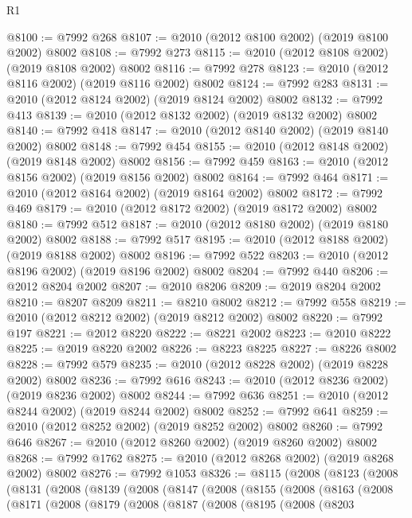 \begin{lexlean}{R1}
\begin{coremodule}
@8100 := @7992 @268
@8107 := @2010 (@2012 @8100 @2002) (@2019 @8100 @2002) @8002
@8108 := @7992 @273
@8115 := @2010 (@2012 @8108 @2002) (@2019 @8108 @2002) @8002
@8116 := @7992 @278
@8123 := @2010 (@2012 @8116 @2002) (@2019 @8116 @2002) @8002
@8124 := @7992 @283
@8131 := @2010 (@2012 @8124 @2002) (@2019 @8124 @2002) @8002
@8132 := @7992 @413
@8139 := @2010 (@2012 @8132 @2002) (@2019 @8132 @2002) @8002
@8140 := @7992 @418
@8147 := @2010 (@2012 @8140 @2002) (@2019 @8140 @2002) @8002
@8148 := @7992 @454
@8155 := @2010 (@2012 @8148 @2002) (@2019 @8148 @2002) @8002
@8156 := @7992 @459
@8163 := @2010 (@2012 @8156 @2002) (@2019 @8156 @2002) @8002
@8164 := @7992 @464
@8171 := @2010 (@2012 @8164 @2002) (@2019 @8164 @2002) @8002
@8172 := @7992 @469
@8179 := @2010 (@2012 @8172 @2002) (@2019 @8172 @2002) @8002
@8180 := @7992 @512
@8187 := @2010 (@2012 @8180 @2002) (@2019 @8180 @2002) @8002
@8188 := @7992 @517
@8195 := @2010 (@2012 @8188 @2002) (@2019 @8188 @2002) @8002
@8196 := @7992 @522
@8203 := @2010 (@2012 @8196 @2002) (@2019 @8196 @2002) @8002
@8204 := @7992 @440
@8206 := @2012 @8204 @2002
@8207 := @2010 @8206
@8209 := @2019 @8204 @2002
@8210 := @8207 @8209
@8211 := @8210 @8002
@8212 := @7992 @558
@8219 := @2010 (@2012 @8212 @2002) (@2019 @8212 @2002) @8002
@8220 := @7992 @197
@8221 := @2012 @8220
@8222 := @8221 @2002
@8223 := @2010 @8222
@8225 := @2019 @8220 @2002
@8226 := @8223 @8225
@8227 := @8226 @8002
@8228 := @7992 @579
@8235 := @2010 (@2012 @8228 @2002) (@2019 @8228 @2002) @8002
@8236 := @7992 @616
@8243 := @2010 (@2012 @8236 @2002) (@2019 @8236 @2002) @8002
@8244 := @7992 @636
@8251 := @2010 (@2012 @8244 @2002) (@2019 @8244 @2002) @8002
@8252 := @7992 @641
@8259 := @2010 (@2012 @8252 @2002) (@2019 @8252 @2002) @8002
@8260 := @7992 @646
@8267 := @2010 (@2012 @8260 @2002) (@2019 @8260 @2002) @8002
@8268 := @7992 @1762
@8275 := @2010 (@2012 @8268 @2002) (@2019 @8268 @2002) @8002
@8276 := @7992 @1053
@8326 := @8115
    (@2008
      (@8123
        (@2008
          (@8131
            (@2008
              (@8139
                (@2008
                  (@8147
                    (@2008
                      (@8155
                        (@2008
                          (@8163
                            (@2008
                              (@8171
                                (@2008
                                  (@8179
                                    (@2008
                                      (@8187
                                        (@2008
                                          (@8195
                                            (@2008
                                              (@8203

\end{coremodule}
\end{lexlean}
